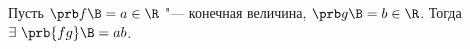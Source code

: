 
 	Пусть $\prb f\B=a\in\R$ "--- конечная величина, $\prb g\B=b\in\R$. Тогда $\exists\ \prb{fg}\B=ab$.
 